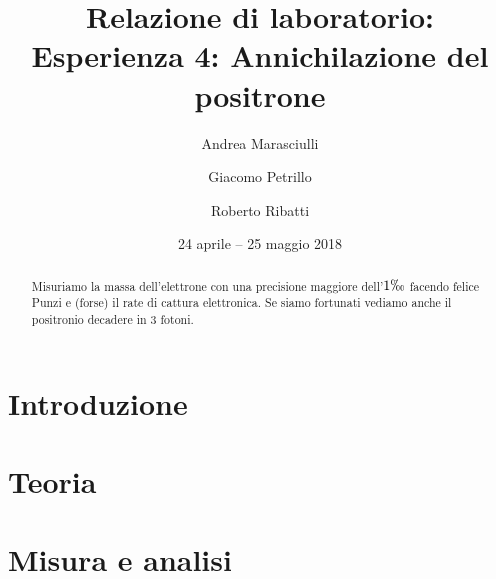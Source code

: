 \documentclass[a4paper]{article}
\title{Relazione di laboratorio:\\
Esperienza 4: Annichilazione del positrone}
\author{Andrea Marasciulli
\and Giacomo Petrillo
\and Roberto Ribatti}
\date{24 aprile -- 25 maggio 2018}
\begin{document}
\maketitle

\begin{abstract}

Misuriamo la massa dell'elettrone con una precisione maggiore dell'$1\permil$ facendo felice Punzi e (forse) il rate di cattura elettronica. Se siamo fortunati vediamo anche il positronio decadere in 3 fotoni.

\end{abstract}

{\tableofcontents}

\newpage
\section{Introduzione}



\section{Teoria}



\section{Misura e analisi}







\appendix
\end{document}
